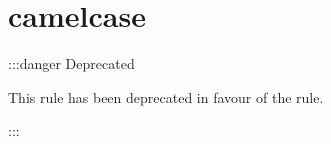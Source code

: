 \chapter{camelcase}
\hypertarget{md_node__modules_2_0dtypescript-eslint_2eslint-plugin_2docs_2rules_2camelcase}{}\label{md_node__modules_2_0dtypescript-eslint_2eslint-plugin_2docs_2rules_2camelcase}
\+::\+:danger Deprecated

This rule has been deprecated in favour of the  rule.

\+::\+: 